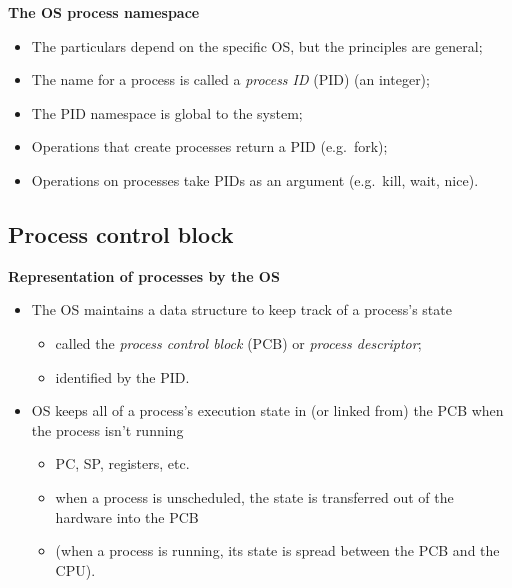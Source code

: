 \documentclass[11pt,a4paper]{article}
\begin{document}
\textbf{The OS process namespace}
\begin{itemize}
    \item The particulars depend on the specific OS, but the principles are general;
    \item The name for a process is called a \emph{process ID} (PID) (an integer);
    \item The PID namespace is global to the system;
    \item Operations that create processes return a PID (e.g.\ fork);
    \item Operations on processes take PIDs as an argument (e.g.\ kill, wait, nice).\
\end{itemize}

\subsection{Process control block}

\textbf{Representation of processes by the OS}
\begin{itemize}
    \item The OS maintains a data structure to keep track of a process's state
        \begin{itemize}
            \item called the \emph{process control block} (PCB)
                or \emph{process descriptor};
            \item identified by the PID.\
        \end{itemize}
    \item OS keeps all of a process's execution state in (or linked from) the PCB
        when the process isn't running
        \begin{itemize}
            \item PC, SP, registers, etc.
            \item when a process is unscheduled, the state is transferred out of the
                hardware into the PCB
            \item (when a process is running, its state is spread between the PCB and the CPU).
        \end{itemize}
\end{itemize}
\end{document}
